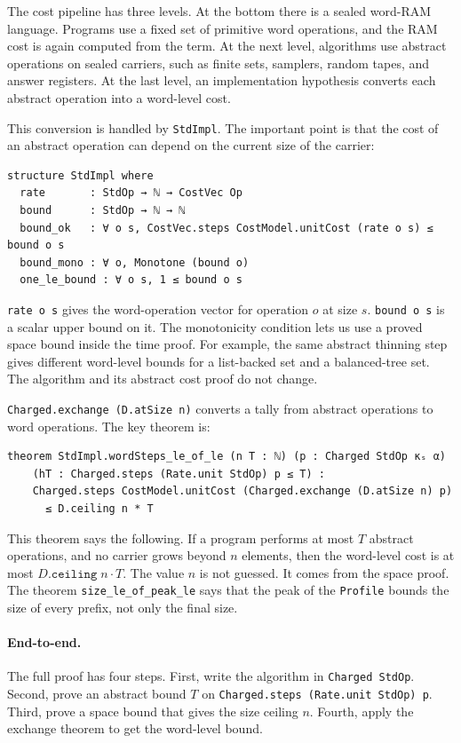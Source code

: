 \documentclass[acmsmall,nonacm]{acmart}
\begin{document}
The cost pipeline has three levels.
At the bottom there is a sealed word-RAM language.
Programs use a fixed set of primitive word operations, and the RAM cost is again computed from the term.
At the next level, algorithms use abstract operations on sealed carriers, such as finite sets, samplers, random tapes, and answer registers.
At the last level, an implementation hypothesis converts each abstract operation into a word-level cost.

This conversion is handled by \lstinline{StdImpl}.
The important point is that the cost of an abstract operation can depend on the current size of the carrier:

\begin{lstlisting}
structure StdImpl where
  rate       : StdOp → ℕ → CostVec Op
  bound      : StdOp → ℕ → ℕ
  bound_ok   : ∀ o s, CostVec.steps CostModel.unitCost (rate o s) ≤ bound o s
  bound_mono : ∀ o, Monotone (bound o)
  one_le_bound : ∀ o s, 1 ≤ bound o s
\end{lstlisting}

\lstinline{rate o s} gives the word-operation vector for operation $o$ at size $s$.
\lstinline{bound o s} is a scalar upper bound on it.
The monotonicity condition lets us use a proved space bound inside the time proof.
For example, the same abstract thinning step gives different word-level bounds for a list-backed set and a balanced-tree set.
The algorithm and its abstract cost proof do not change.

\lstinline{Charged.exchange (D.atSize n)} converts a tally from abstract operations to word operations.
The key theorem is:

\begin{lstlisting}
theorem StdImpl.wordSteps_le_of_le (n T : ℕ) (p : Charged StdOp κₛ α)
    (hT : Charged.steps (Rate.unit StdOp) p ≤ T) :
    Charged.steps CostModel.unitCost (Charged.exchange (D.atSize n) p)
      ≤ D.ceiling n * T
\end{lstlisting}

This theorem says the following.
If a program performs at most $T$ abstract operations, and no carrier grows beyond $n$ elements, then the word-level cost is at most $D.\texttt{ceiling}\;n \cdot T$.
The value $n$ is not guessed.
It comes from the space proof.
The theorem \lstinline{size_le_of_peak_le} says that the peak of the \lstinline{Profile} bounds the size of every prefix, not only the final size.

\paragraph{End-to-end.}
The full proof has four steps.
First, write the algorithm in \lstinline{Charged StdOp}.
Second, prove an abstract bound $T$ on \lstinline{Charged.steps (Rate.unit StdOp) p}.
Third, prove a space bound that gives the size ceiling $n$.
Fourth, apply the exchange theorem to get the word-level bound.
\end{document}
